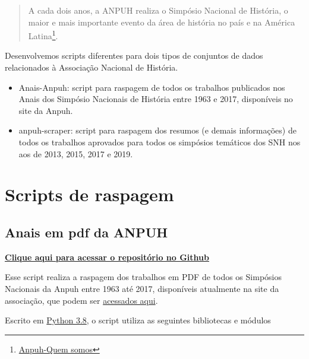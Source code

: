 \documentclass[
]{book}
\begin{document}
\begin{quote}
A cada dois anos, a ANPUH realiza o Simpósio Nacional de História, o maior e mais importante evento da área de história no país e na América Latina\footnote{\href{https://anpuh.org.br/index.php/quem-somos}{Anpuh-Quem somos}}.
\end{quote}

Desenvolvemos scripts diferentes para dois tipos de conjuntos de dados relacionados à Associação Nacional de História.

\begin{itemize}
\item
  Anais-Anpuh: script para raspagem de todos os trabalhos publicados nos Anais dos Simpósio Nacionais de História entre 1963 e 2017, disponíveis no site da Anpuh.
\item
  anpuh-scraper: script para raspagem dos resumos (e demais informações) de todos os trabalhos aprovados para todos os simpósios temáticos dos SNH nos aos de 2013, 2015, 2017 e 2019.
\end{itemize}

\hypertarget{scripts-de-raspagem}{%
\section{Scripts de raspagem}\label{scripts-de-raspagem}}

\hypertarget{anais-em-pdf-da-anpuh}{%
\subsection{Anais em pdf da ANPUH}\label{anais-em-pdf-da-anpuh}}

\href{https://github.com/LABHDUFBA/Anais-Anpuh}{\textbf{Clique aqui para acessar o repositório no Github}}

Esse script realiza a raspagem dos trabalhos em PDF de todos os Simpósios Nacionais da Anpuh entre 1963 até 2017, disponíveis atualmente na site da associação, que podem ser \href{https://anpuh.org.br/index.php/documentos/anais}{acessados aqui}.

Escrito em \href{https://www.python.org/}{Python 3.8}, o script utiliza as seguintes bibliotecas e módulos
\end{document}
